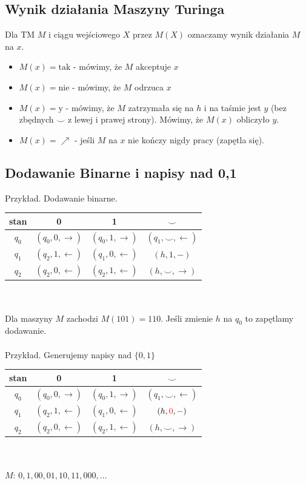 \documentclass{article}
\numberwithin{equation}{subsection}
\begin{document}
\subsection{Wynik działania Maszyny Turinga}

Dla TM $M$ i ciągu wejściowego $X$ przez $M(X)$ oznaczamy wynik działania $M$ na $x$.
\begin{itemize}
    \item $M(x) = \text{tak}$ - mówimy, że $M$ akceptuje $x$
    \item $M(x) = \text{nie}$ - mówimy, że $M$ odrzuca $x$
    \item $M(x) = \text{y}$ - mówimy, że $M$ zatrzymała się na $h$ i na taśmie jest $y$ (bez zbędnych $\smile$ z lewej i prawej strony). 
    Mówimy, że $M(x)$ obliczyło $y$.
    \item $M(x) = \nearrow$ - jeśli $M$ na $x$ nie kończy nigdy pracy (zapętla się).
\end{itemize}

\subsection{Dodawanie Binarne i napisy nad 0,1}

Przykład. Dodawanie binarne.\\
\begin{tabular}{|c|ccc|}
\hline
stan & 0 & 1 & $\smile$ \\
\hline
$q_0$ & $(q_0, 0, \to)$ & $(q_0,1,\to)$ & $(q_1,\smile, \leftarrow)$ \\
$q_1$ & $(q_2, 1, \leftarrow)$ & $(q_1, 0, \leftarrow)$ & $(h, 1, -)$ \\ 
$q_2$ & $(q_2, 0, \leftarrow)$ & $(q_2, 1, \leftarrow)$ & $(h, \smile, \to)$ \\
\hline
\end{tabular}
\\\\
Dla maszyny $M$ zachodzi $M(101)=110$. Jeśli zmienie $h$ na $q_0$ to zapętlamy dodawanie.
\\\\
Przykład. Generujemy napisy nad $\{0,1\}$\\
\begin{tabular}{|c|ccc|}
\hline
stan & 0 & 1 & $\smile$ \\
\hline
$q_0$ & $(q_0, 0, \to)$ & $(q_0,1,\to)$ & $(q_1,\smile, \leftarrow)$ \\
$q_1$ & $(q_2, 1, \leftarrow)$ & $(q_1, 0, \leftarrow)$ & $(h, \color{red}{0}\color{black}, -)$ \\ 
$q_2$ & $(q_2, 0, \leftarrow)$ & $(q_2, 1, \leftarrow)$ & $(h, \smile, \to)$ \\
\hline
\end{tabular}
\\\\
$M$: $0,1,00,01,10,11,000,\dots$
\end{document}
